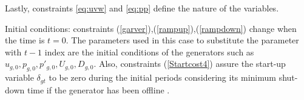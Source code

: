Lastly, constraints \eqref{eq:uvw} and \eqref{eq:pp}  define the nature of the variables.

Initial conditions: constraints (\ref{garver}),(\ref{rampup}),(\ref{rampdown}) change when the time is $t=0$. The parameters used in this case to substitute the parameter with $t-1$ index are the initial conditions of the generators such as $u_{g,0}, p_{g,0}, p'_{g,0}, U_{g,0}, D_{g,0}$. Also, constraints (\ref{Startcost4}) assure the start-up variable $\delta_{gt}$ to be zero during the initial periods considering its minimum shut-down time if the generator has been offline \citep{Morales-Espania2013}.






